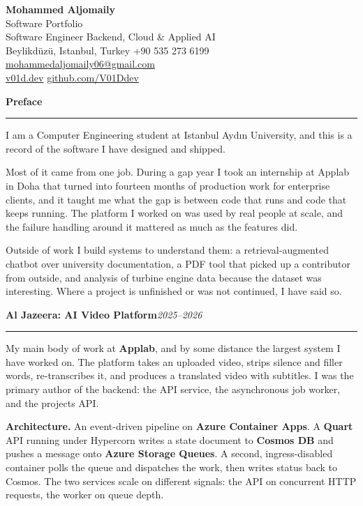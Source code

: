 \documentclass[11pt,a4paper]{article}
\newcommand{\entry}[2]{%
  \vspace{6pt}%
  {\Large\bfseries #1}\hfill{\itshape\small #2}\par
  \vspace{3pt}\hrule\vspace{4pt}%
}
\begin{document}
\begin{center}
    {\LARGE \textbf{Mohammed Aljomaily}}\\[3pt]
    {\large Software Portfolio}\\[6pt]
    {\small Software Engineer \textbar{} Backend, Cloud \& Applied AI}\\[3pt]
    {\small Beylikd\"uz\"u, Istanbul, Turkey \textbar{} +90 535 273 6199 \textbar{}
    \href{mailto:mohammedaljomaily06@gmail.com}{mohammedaljomaily06@gmail.com}}\\[2pt]
    {\small \href{https://v01d.dev}{v01d.dev} \textbar{} \href{https://github.com/V01Ddev}{github.com/V01Ddev}}
\end{center}

\entry{Preface}{}

I am a Computer Engineering student at Istanbul Ayd{\i}n University, and this is
a record of the software I have designed and shipped.

Most of it came from one job. During a gap year I took an internship at Applab
in Doha that turned into fourteen months of production work for enterprise
clients, and it taught me what the gap is between code that runs and code that
keeps running. The platform I worked on was used by real people at scale, and
the failure handling around it mattered as much as the features did.

Outside of work I build systems to understand them: a retrieval-augmented
chatbot over university documentation, a PDF tool that picked up a contributor
from outside, and analysis of turbine engine data because the dataset was
interesting. Where a project is unfinished or was not continued, I have said so.

\entry{Al Jazeera: AI Video Platform}{2025--2026}

My main body of work at \textbf{Applab}, and by some distance the largest system
I have worked on. The platform takes an uploaded video, strips silence and
filler words, re-transcribes it, and produces a translated video with subtitles.
I was the primary author of the backend: the API service, the asynchronous job
worker, and the projects API.

\textbf{Architecture.} An event-driven pipeline on \textbf{Azure Container Apps}.
A \textbf{Quart} API running under Hypercorn writes a state document to
\textbf{Cosmos DB} and pushes a message onto \textbf{Azure Storage Queues}. A
second, ingress-disabled container polls the queue and dispatches the work, then
writes status back to Cosmos. The two services scale on different signals: the
API on concurrent HTTP requests, the worker on queue depth.
\end{document}
